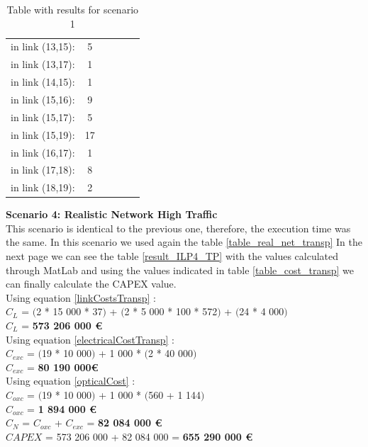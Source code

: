 \begin{table}[h!]
\begin{tabular}{|| c | c || c | c || c | c ||}
in link (13,15): & 5& & & & \\
in link (13,17): & 1& & & & \\
in link (14,15): & 1& & & & \\
in link (15,16): & 9& & & & \\
in link (15,17): & 5& & & & \\
in link (15,19): & 17& & & & \\
in link (16,17): & 1& & & & \\
in link (17,18): & 8& & & & \\
in link (18,19): & 2& & & & \\
\hline
\end{tabular}
\caption{Table with results  for scenario 1}
\label{result_ILP3_TP}
\end{table}

\newpage
\textbf{Scenario 4: Realistic Network High Traffic} \label{Scenario4_transp} \\

This scenario is identical to the previous one, therefore, the execution time was the same. In this scenario we used again the table \ref{table_real_net_transp} In the next page we can see the table \ref{result_ILP4_TP} with the values calculated through MatLab and using the values indicated in table \ref{table_cost_transp} we can finally calculate the CAPEX value. \\

Using equation \ref{linkCostsTransp} : \\
$C_L$ = $($2 * 15 000 * 37$)$ + $($2 * 5 000 * 100 * 572$)$ + $($24 * 4 000$)$ \\
$C_L$ = \textbf{573 206 000 \euro} \\

Using equation \ref{electricalCostTransp} : \\
$C_{exc}$ = $($19 * 10 000$)$ + 1 000 * $($2 * 40 000$)$ \\
$C_{exc}$ = \textbf{80 190 000\euro} \\

Using equation \ref{opticalCost} : \\
$C_{oxc}$ = $($19 * 10 000$)$ + 1 000 * $($560 + 1 144$)$ \\
$C_{oxc}$ = \textbf{1 894 000 \euro} \\
$C_N$ = $C_{oxc}$ + $C_{exc}$ = \textbf{82 084 000 \euro} \\

$CAPEX$ = 573 206 000 + 82 084 000 = \textbf{655 290 000 \euro}\\

